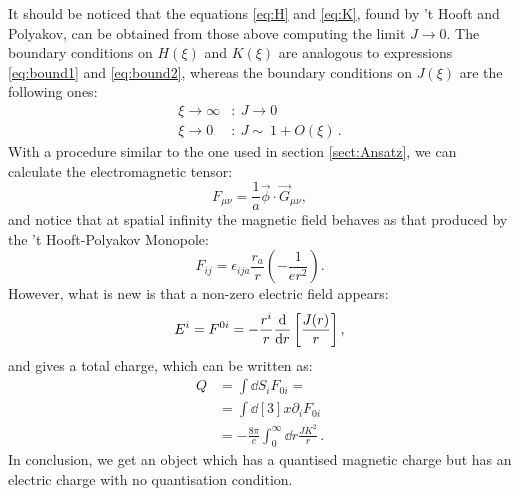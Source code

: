 \documentclass[main.tex]{subfiles}
\begin{document}
 It should be noticed that the equations \eqref{eq:H} and \eqref{eq:K}, found by 't Hooft and Polyakov, can be obtained from those above computing the limit $J \to 0$.
 The boundary conditions on $H(\xi)$ and $K(\xi)$ are analogous to expressions \eqref{eq:bound1} and \eqref{eq:bound2}, whereas the boundary conditions on  $J(\xi)$ are the following ones: 
 \begin{subequations}
 \begin{align}
 \xi \to \infty &\colon  \ J \to 0     \label{eq:bound3}\\
 \xi  \to 0   &\colon  \ J \sim \ 1 + O(\xi)  \label{eq:bound4}\,.
  \end{align}
 \end{subequations}
With a procedure similar to the one used in section \ref{sect:Ansatz}, we can calculate the electromagnetic tensor: 
\begin{equation}
 F_{\mu \nu} = \frac{1}{a} \vec{\phi} \cdot \vec{G}_{\mu \nu },
\end{equation}
and notice that at spatial infinity the magnetic field behaves as that produced by the 't Hooft-Polyakov Monopole: 
\begin{equation}
F_{ij}= \epsilon_{ija} \frac{r_a}{r} \left(   - \frac{1}{er^2}    \right).
\end{equation}
However, what is new is that a non-zero electric field appears: 
\begin{equation}
E^i = F^{0i}= - \frac{r^i}{r} \dv{}{r} \left[ \frac{J(r)}{r} \right],
\end{equation}
and gives a total charge, which can be written as: 
\begin{equation}
\begin{split}
Q &= \int \dd{S_i}  F_{0i} = \\
  &= \int \dd[3]{x} \partial_i F_{0i}\\
  &= - \frac{8 \pi }{e}\int_0^{\infty} \dd{r} \frac{JK^2}{r}\,.
\end{split}
\end{equation}
In conclusion, we get an object which has a quantised magnetic charge but has an electric charge with no quantisation condition. 
\end{document}

